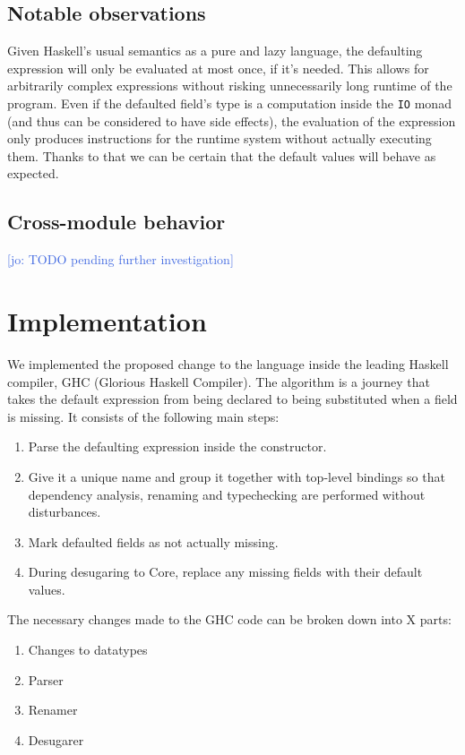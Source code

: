 \documentclass[en]{pracamgr}
\newcommand{\jcom}[1]{\textcolor{RoyalBlue}{[jo: #1]}}
\begin{document}
\section{Notable observations}
Given Haskell's usual semantics as a pure and lazy language, the defaulting expression will only be evaluated at most once, if it's needed.
This allows for arbitrarily complex expressions without risking unnecessarily long runtime of the program. 
Even if the defaulted field's type is a computation inside the \texttt{IO} monad (and thus can be considered to have side effects), the evaluation of the expression only produces instructions for the runtime system without actually executing them.
Thanks to that we can be certain that the default values will behave as expected.

\section{Cross-module behavior}
\jcom{TODO pending further investigation}

\chapter{Implementation}

We implemented the proposed change to the language inside the leading Haskell compiler, GHC (Glorious Haskell Compiler).
The algorithm is a journey that takes the default expression from being declared to being substituted when a field is missing.
It consists of the following main steps:
\begin{enumerate}
  \item Parse the defaulting expression inside the constructor.
  \item Give it a unique name and group it together with top-level bindings so that dependency analysis, renaming and typechecking are performed without disturbances.
  \item Mark defaulted fields as not actually missing.
  \item During desugaring to Core, replace any missing fields with their default values.
\end{enumerate}

The necessary changes made to the GHC code can be broken down into X parts:
\begin{enumerate}
  \item Changes to datatypes
  \item Parser
  \item Renamer
  \item Desugarer
\end{enumerate}
\end{document}
